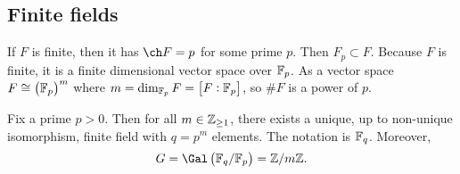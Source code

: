\pagebreak

\subsection{Finite fields}


If $ F $ is finite, then it has $ \ch F = p $ for some prime $ p $. Then $ F_p \subset F $. Because $ F $ is finite, it is a finite dimensional vector space over $ \mathbb{F}_p $. As a vector space $ F \cong \br{\FF_p}^m $ where $ m = \dim_{\FF_p} F = \sbr{F : \FF_p} $, so $ \#F $ is a power of $ p $.

\begin{theorem}
Fix a prime $ p > 0 $. Then for all $ m \in \mathbb{Z}_{\ge 1} $, there exists a unique, up to non-unique isomorphism, finite field with $ q = p^m $ elements. The notation is $ \mathbb{F}_q $. Moreover,
$$ G = \Gal\br{\FF_q / \FF_p} = \ZZ / m\ZZ. $$
\end{theorem}

